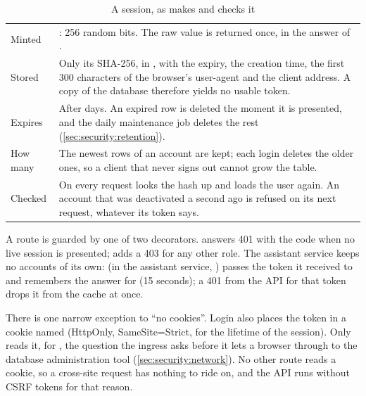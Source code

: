\begin{table}[H]
\caption{A session, as  makes and checks it}\label{tab:security:session}
\begin{tabularx}{\textwidth}{@{}L{38mm}Y@{}}
\toprule
{} &  \\
\midrule
Minted & : 256 random bits. The raw value is returned once, in the answer of . \\
Stored & Only its SHA-256, in , with the expiry, the creation time, the first 300 characters of the browser's user-agent and the client address. A copy of the database therefore yields no usable token. \\
Expires & After  \code{=}  days. An expired row is deleted the moment it is presented, and the daily maintenance job deletes the rest (\cref{sec:security:retention}). \\
How many & The  \code{=}  newest rows of an account are kept; each login deletes the older ones, so a client that never signs out cannot grow the table. \\
Checked & On every request  looks the hash up and loads the user again. An account that was deactivated a second ago is refused on its next request, whatever its token says. \\
\bottomrule
\end{tabularx}
\end{table}

A route is guarded by one of two decorators.  answers 401 with the code
 when no live session is presented;  adds a
403  for any other role. The assistant service keeps no accounts of its own:
 (in the assistant service, ) passes the
token it received to  and remembers the answer for
 (15 seconds); a 401 from the API for that token drops it from the
cache at once.

There is one narrow exception to \enquote{no cookies}. Login also places the token in a
cookie named  (HttpOnly, SameSite=Strict, for the lifetime of the
session). Only  reads it, for , the
question the ingress asks before it lets a browser through to the database administration
tool (\cref{sec:security:network}). No other route reads a cookie, so a cross-site request
has nothing to ride on, and the API runs without CSRF tokens for that reason.

